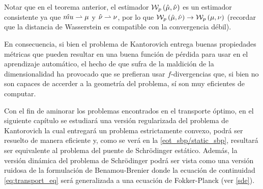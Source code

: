 Notar que en el teorema anterior, el estimador $\mathcal{W}_{p}\left(\hat{\mu}, \hat{\nu}\right)$ es un estimador consistente ya que $\hat{mu}\rightharpoonup \mu$ y $\hat{\nu}\rightharpoonup\nu$, por lo que $\mathcal{W}_{p}\left(\hat{\mu}, \hat{\nu}\right) \to \mathcal{W}_{p}\left(\mu,\nu\right)$ (recordar que la distancia de Wasserstein es compatible con la convergencia débil).

En consecuencia, si bien el problema de Kantorovich entrega buenas propiedades métricas que pueden resultar en una buena función de pérdida para usar en el aprendizaje automático, el hecho de que sufra de la maldición de la dimensionalidad ha provocado que se prefieran usar $f$-divergencias que, si bien no son capaces de accerder a la geometría del problema, sí son muy eficientes de computar.

Con el fin de aminorar los problemas encontrados en el transporte óptimo, en el siguiente capítulo se estudiará una versión regularizada del problema de Kantorovich la cual entregará un problema estrictamente convexo, podrá ser resuelto de manera eficiente y, como se verá en la \autoref{eot_sbp/static_sbp}, resultará ser equivalente al problema del puente de Schrödinger estático. Además, la versión dinámica del problema de Schrödinger podrá ser vista como una versión ruidosa de la formulación de Benamou-Brenier donde la ecuación de continuidad \eqref{eq:transport_eq} será generalizada a una ecuación de Fokker-Planck (ver \autoref{sde}).